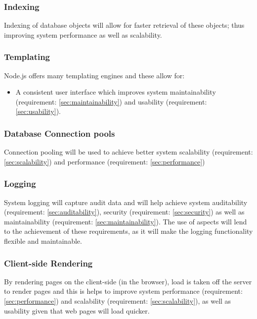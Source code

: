 \subsubsection{Indexing} \label{sec:indexing}
Indexing of database objects will allow for faster retrieval of these objects; thus improving system performance as well as scalability.

\subsubsection{Templating} \label{sec:template}
Node.js offers many templating engines and these allow for:
\begin{itemize}
	\item A consistent user interface which improves system maintainability (requirement: \ref{sec:maintainability}) and usability (requirement: \ref{sec:usability}).
\end{itemize}

\subsubsection{Database Connection pools} \label{sec:pools}
Connection pooling will be used to achieve better system scalability (requirement: \ref{sec:scalability}) and performance (requirement: \ref{sec:performance})

\subsubsection{Logging} \label{sec:logging}
System logging will capture audit data and will help achieve system auditability (requirement: \ref{sec:auditability}), security (requirement: \ref{sec:security}) as well as maintainability (requirement: \ref{sec:maintainability}). The use of aspects will lend to the achievement of these requirements, as it will make the logging functionality flexible and maintainable.

\subsubsection{Client-side Rendering} \label{sec:clientrender}
By rendering pages on the client-side (in the browser), load is taken off the server to render pages and this is helps to improve system performance (requirement: \ref{sec:performance}) and scalability (requirement: \ref{sec:scalability}), as well as usability given that web pages will load quicker.


